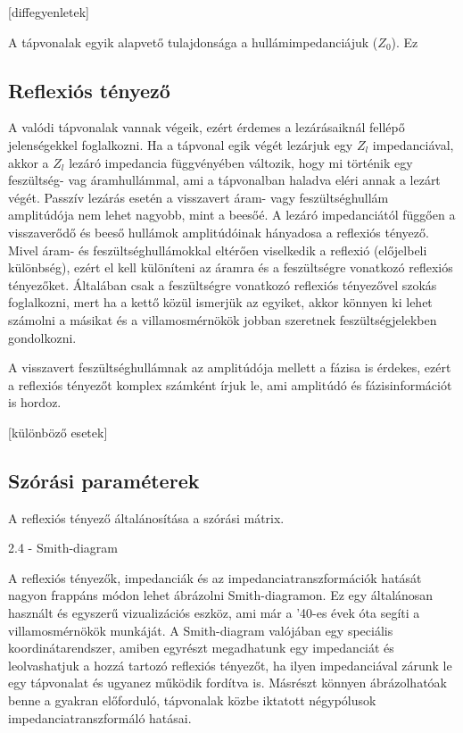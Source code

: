 \documentclass[a4paper,12pt,titlepage]{article}
\begin{document}
[diffegyenletek]

A tápvonalak egyik alapvető tulajdonsága a hullámimpedanciájuk ($Z_0$). Ez

\subsection{Reflexiós tényező}

A valódi tápvonalak vannak végeik, ezért érdemes a lezárásaiknál fellépő jelenségekkel foglalkozni. Ha a tápvonal egik végét lezárjuk egy $Z_l$ impedanciával, akkor a $Z_l$ lezáró impedancia függvényében változik, hogy mi történik egy feszültség- vag áramhullámmal, ami a tápvonalban haladva eléri annak a lezárt végét. Passzív lezárás esetén a visszavert áram- vagy feszültséghullám amplitúdója nem lehet nagyobb, mint a beesőé. A lezáró impedanciától függően a visszaverődő és beeső hullámok amplitúdóinak hányadosa a reflexiós tényező. Mivel áram- és feszültséghullámokkal eltérően viselkedik a reflexió (előjelbeli különbség), ezért el kell különíteni az áramra és a feszültségre vonatkozó reflexiós tényezőket. Általában csak a feszültségre vonatkozó reflexiós tényezővel szokás foglalkozni, mert ha a kettő közül ismerjük az egyiket, akkor könnyen ki lehet számolni a másikat és a villamosmérnökök jobban szeretnek feszültségjelekben gondolkozni.

A visszavert feszültséghullámnak az amplitúdója mellett a fázisa is érdekes, ezért a reflexiós tényezőt komplex számként írjuk le, ami amplitúdó és fázisinformációt is hordoz.

[különböző esetek]

\subsection{Szórási paraméterek}

A reflexiós tényező általánosítása a szórási mátrix.

2.4 - Smith-diagram

A reflexiós tényezők, impedanciák és az impedanciatranszformációk hatását nagyon frappáns módon lehet ábrázolni Smith-diagramon. Ez egy általánosan használt és egyszerű vizualizációs eszköz, ami már a '40-es évek óta segíti a villamosmérnökök munkáját. A Smith-diagram valójában egy speciális koordinátarendszer, amiben egyrészt megadhatunk egy impedanciát és leolvashatjuk a hozzá tartozó reflexiós tényezőt, ha ilyen impedanciával zárunk le egy tápvonalat és ugyanez működik fordítva is. Másrészt könnyen ábrázolhatóak benne a gyakran előforduló, tápvonalak közbe iktatott négypólusok impedanciatranszformáló hatásai.
\end{document}
